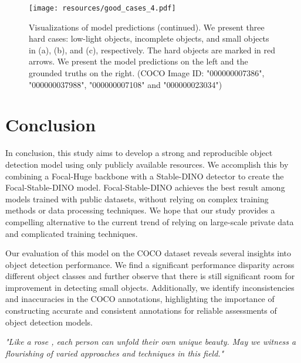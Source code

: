 \documentclass{article}
\begin{document}
\begin{figure}[h]
    \centering
\texttt{[image: resources/good\_cases\_4.pdf]}
\caption{Visualizations of model predictions (continued). We present three hard cases: low-light objects, incomplete objects,  and small objects in (a), (b), and (c), respectively. The hard objects are marked in red arrows. We present the model predictions on the left and the grounded truths on the right. (COCO Image ID: "000000007386", "000000037988", "000000007108" and "000000023034")
    }
    \label{fig:vis2}
\end{figure} \section{Conclusion}

In conclusion, this study aims to develop a strong and reproducible object detection model using only publicly available resources. We accomplish this by combining a Focal-Huge backbone with a Stable-DINO detector to create the Focal-Stable-DINO model. Focal-Stable-DINO achieves the best result among models trained with public datasets, without relying on complex training methods or data processing techniques. We hope that our study provides a compelling alternative to the current trend of relying on large-scale private data and complicated training techniques. 

Our evaluation of this model on the COCO dataset reveals several insights into object detection performance. We find a significant performance disparity across different object classes and further observe that there is still significant room for improvement in detecting small objects. Additionally, we identify inconsistencies and inaccuracies in the COCO annotations, highlighting the importance of constructing accurate and consistent annotations for reliable assessments of object detection models.

\small{\textit{"Like a rose \cite{zhang2023rose}, each person can unfold their own unique beauty. May we witness a flourishing of varied approaches and techniques in this field."}} 


\clearpage


\end{document}
